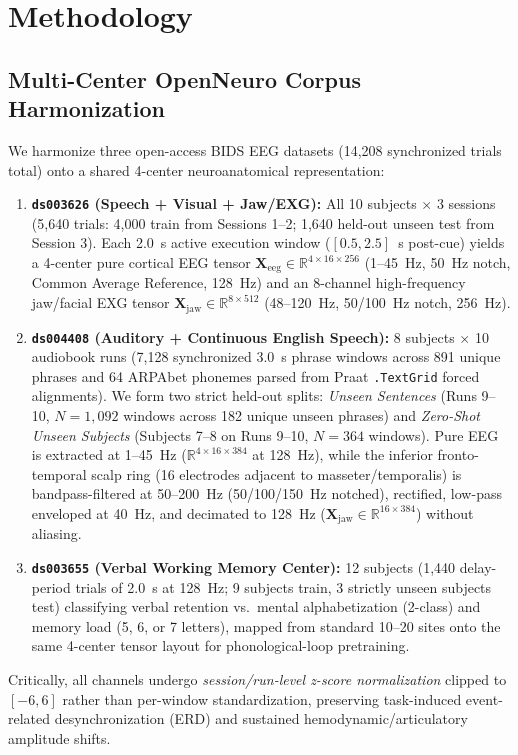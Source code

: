 \documentclass[journal]{IEEEtran}
\begin{document}
\section{Methodology}
\subsection{Multi-Center OpenNeuro Corpus Harmonization}
We harmonize three open-access BIDS EEG datasets (14,208 synchronized trials total) onto a shared 4-center neuroanatomical representation:
\begin{enumerate}
    \item \textbf{\texttt{ds003626} (Speech + Visual + Jaw/EXG):} All 10 subjects $\times$ 3 sessions (5,640 trials: 4,000 train from Sessions 1--2; 1,640 held-out unseen test from Session 3). Each 2.0~s active execution window ($[0.5, 2.5]$~s post-cue) yields a 4-center pure cortical EEG tensor $\mathbf{X}_{\text{eeg}} \in \mathbb{R}^{4 \times 16 \times 256}$ (1--45~Hz, 50~Hz notch, Common Average Reference, 128~Hz) and an 8-channel high-frequency jaw/facial EXG tensor $\mathbf{X}_{\text{jaw}} \in \mathbb{R}^{8 \times 512}$ (48--120~Hz, 50/100~Hz notch, 256~Hz).
    \item \textbf{\texttt{ds004408} (Auditory + Continuous English Speech):} 8 subjects $\times$ 10 audiobook runs (7,128 synchronized 3.0~s phrase windows across 891 unique phrases and 64 ARPAbet phonemes parsed from Praat \texttt{.TextGrid} forced alignments). We form two strict held-out splits: \emph{Unseen Sentences} (Runs 9--10, $N=1,092$ windows across 182 unique unseen phrases) and \emph{Zero-Shot Unseen Subjects} (Subjects 7--8 on Runs 9--10, $N=364$ windows). Pure EEG is extracted at 1--45~Hz ($\mathbb{R}^{4 \times 16 \times 384}$ at 128~Hz), while the inferior fronto-temporal scalp ring (16 electrodes adjacent to masseter/temporalis) is bandpass-filtered at 50--200~Hz (50/100/150~Hz notched), rectified, low-pass enveloped at 40~Hz, and decimated to 128~Hz ($\mathbf{X}_{\text{jaw}} \in \mathbb{R}^{16 \times 384}$) without aliasing.
    \item \textbf{\texttt{ds003655} (Verbal Working Memory Center):} 12 subjects (1,440 delay-period trials of 2.0~s at 128~Hz; 9 subjects train, 3 strictly unseen subjects test) classifying verbal retention vs.\ mental alphabetization (2-class) and memory load (5, 6, or 7 letters), mapped from standard 10--20 sites onto the same 4-center tensor layout for phonological-loop pretraining.
\end{enumerate}
Critically, all channels undergo \emph{session/run-level z-score normalization} clipped to $[-6, 6]$ rather than per-window standardization, preserving task-induced event-related desynchronization (ERD) and sustained hemodynamic/articulatory amplitude shifts.
\end{document}
